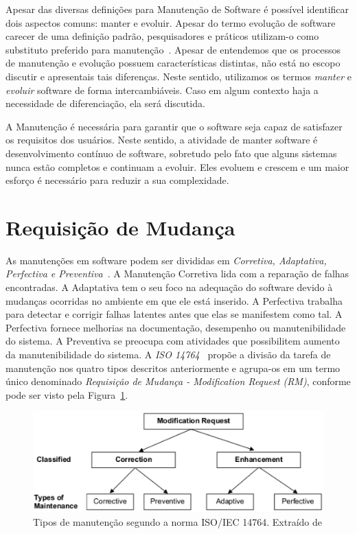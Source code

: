 Apesar das diversas definições para Manutenção de Software é possível identificar dois
aspectos comuns: manter e evoluir. Apesar do termo evolução de software carecer de uma definição
padrão, pesquisadores e práticos utilizam-o como substituto preferido para
manutenção~\cite{Bennett:2000:SME:336512.336534}. Apesar de entendemos que os processos de manutenção e evolução possuem características distintas, não está no escopo discutir e apresentais tais diferenças. Neste sentido, utilizamos os termos \textit{manter} e
\textit{evoluir} software de forma intercambiáveis. Caso em algum contexto haja a necessidade de
diferenciação, ela será discutida.

A Manutenção é necessária para garantir que o software seja capaz de satisfazer os requisitos dos
usuários. Neste sentido, a atividade de manter software é desenvolvimento contínuo de software,
sobretudo pelo fato que alguns sistemas nunca estão completos e continuam a evoluir. Eles evoluem e
crescem e um maior esforço é necessário para reduzir a sua complexidade.

\section{Requisição de Mudança}
\label{sec:requisição_de_mudanca}
As manutenções em software podem ser divididas em \textit{Corretiva, Adaptativa, Perfectiva e Preventiva}~\cite{Lientz:1980:SMM:601062,159342}. A Manutenção
Corretiva lida com a reparação de falhas encontradas. A Adaptativa tem o seu
foco na adequação do software devido à mudanças ocorridas no ambiente em que ele
está inserido. A Perfectiva trabalha para detectar e corrigir falhas latentes
antes que elas se manifestem como tal. A  Perfectiva fornece melhorias na
documentação, desempenho ou manutenibilidade do sistema. A Preventiva se
preocupa com atividades que possibilitem aumento da manutenibilidade do sistema.
A \textit{ISO 14764}~\cite{1703974} propõe a divisão da tarefa de manutenção nos
quatro tipos descritos anteriormente e agrupa-os em um termo único denominado
\textit{{Requisição de Mudança - Modification Request (RM)}}, conforme pode ser visto pela Figura~\ref{fig:modification-request}.

\begin{figure}[hbtp]
\centering
\includegraphics[width=.75\textwidth]{chapter-intro/img/modification_request.eps}
\caption{Tipos de manutenção segundo a norma ISO/IEC 14764. Extraído de
  \cite{1703974}}
\label{fig:modification-request}
\end{figure}

